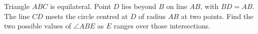 Triangle $ABC$ is equilateral. Point $D$ lies beyond $B$ on line $AB$, with $BD=AB$. The line $CD$ meets the circle centred at $D$ of radius $AB$ at two points. Find the two possible values of $\angle ABE$ as $E$ ranges over those intersections.
